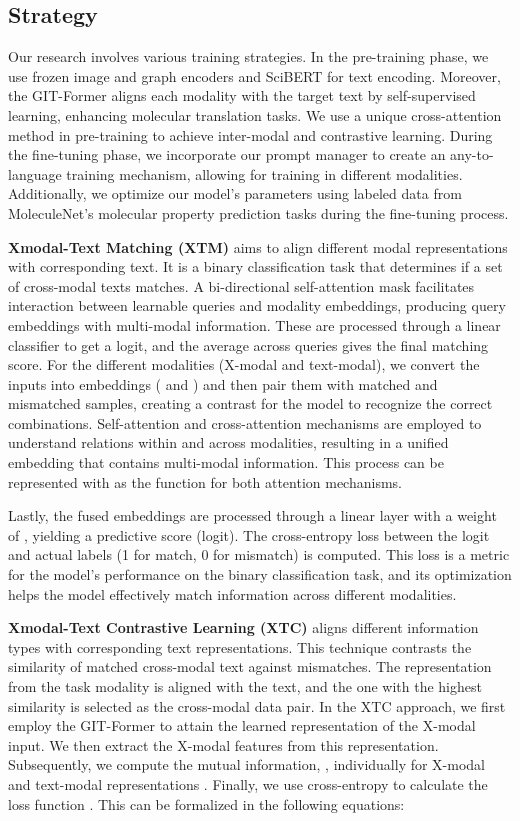 \documentclass{article}
\begin{document}
\subsection{Strategy}
Our research involves various training strategies. In the pre-training phase, we use frozen image and graph encoders and SciBERT for text encoding. 
Moreover, the GIT-Former aligns each modality with the target text by self-supervised learning, enhancing molecular translation tasks. 
We use a unique cross-attention method in pre-training to achieve inter-modal and contrastive learning. 
During the fine-tuning phase, we incorporate our prompt manager to create an any-to-language training mechanism, allowing for training in different modalities. 
Additionally, we optimize our model's parameters using labeled data from MoleculeNet's\cite{wu2018moleculenet} molecular property prediction tasks during the fine-tuning process.

\textbf{Xmodal-Text Matching (XTM)} aims to align different modal representations with corresponding text. It is a binary classification task that determines if a set of cross-modal texts matches. A bi-directional self-attention mask facilitates interaction between learnable queries and modality embeddings, producing query embeddings with multi-modal information. These are processed through a linear classifier to get a logit, and the average across queries gives the final matching score. For the different modalities (X-modal and text-modal), we convert the inputs into embeddings ( and ) and then pair them with matched and mismatched samples, creating a contrast for the model to recognize the correct combinations. Self-attention and cross-attention mechanisms are employed to understand relations within and across modalities, resulting in a unified embedding that contains multi-modal information. This process can be represented with  as the function for both attention mechanisms.



Lastly, the fused embeddings are processed through a linear layer with a weight of , yielding a predictive score (logit). The cross-entropy loss between the logit and actual labels (1 for match, 0 for mismatch) is computed. This loss is a metric for the model's performance on the binary classification task, and its optimization helps the model effectively match information across different modalities.



\textbf{Xmodal-Text Contrastive Learning (XTC)} aligns different information types with corresponding text representations. This technique contrasts the similarity of matched cross-modal text against mismatches. The representation from the task modality is aligned with the text, and the one with the highest similarity is selected as the cross-modal data pair. In the XTC approach, we first employ the GIT-Former to attain the learned representation of the X-modal input. We then extract the X-modal features  from this representation. Subsequently, we compute the mutual information, , individually for X-modal and text-modal representations . Finally, we use cross-entropy to calculate the loss function . This can be formalized in the following equations:
\end{document}

